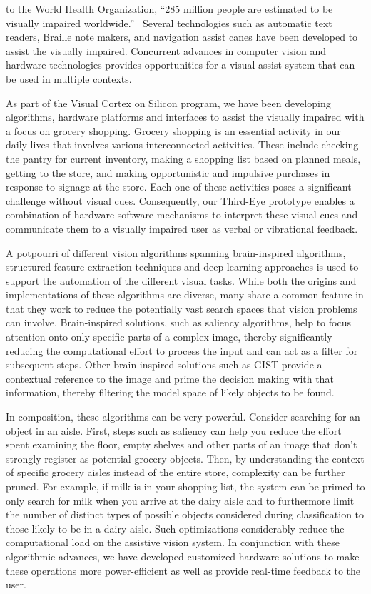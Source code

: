 to the World Health Organization, ``285 million people are estimated
to be visually impaired worldwide.''~\cite{WHOvisuallyimpaired}
Several technologies such as automatic text readers, Braille note
makers, and navigation assist canes have been developed to assist the
visually impaired. Concurrent advances in computer vision and hardware
technologies provides opportunities for a visual-assist system that
can be used in multiple contexts.

As part of the Visual Cortex on Silicon program, we have been
developing algorithms, hardware platforms and interfaces to assist the
visually impaired with a focus on grocery shopping. Grocery shopping
is an essential activity in our daily lives that involves various
interconnected activities. These include checking the pantry for
current inventory, making a shopping list based on planned meals,
getting to the store, and making opportunistic and impulsive purchases
in response to signage at the store. Each one of these activities
poses a significant challenge without visual cues.  Consequently, our
Third-Eye prototype enables a combination of hardware software
mechanisms to interpret these visual cues and communicate them to a
visually impaired user as verbal or vibrational feedback.

A potpourri of different vision algorithms spanning brain-inspired
algorithms, structured feature extraction techniques and deep learning
approaches is used to support the automation of the different visual
tasks. While both the origins and implementations of these algorithms
are diverse, many share a common feature in that they work to reduce
the potentially vast search spaces that vision problems can
involve. Brain-inspired solutions, such as saliency algorithms, help
to focus attention onto only specific parts of a complex image,
thereby significantly reducing the computational effort to process the
input and can act as a filter for subsequent steps.  Other
brain-inspired solutions such as GIST provide a contextual reference
to the image and prime the decision making with that information,
thereby filtering the model space of likely objects to be found.

In composition, these algorithms can be very powerful. Consider
searching for an object in an aisle. First, steps such as saliency can
help you reduce the effort spent examining the floor, empty shelves
and other parts of an image that don't strongly register as potential
grocery objects. Then, by understanding the context of specific
grocery aisles instead of the entire store, complexity can be further
pruned.  For example, if milk is in your shopping list, the system can
be primed to only search for milk when you arrive at the dairy aisle
and to furthermore limit the number of distinct types of possible
objects considered during classification to those likely to be in a
dairy aisle. Such optimizations considerably reduce the computational
load on the assistive vision system. In conjunction with these
algorithmic advances, we have developed customized hardware solutions
to make these operations more power-efficient as well as provide
real-time feedback to the user.

